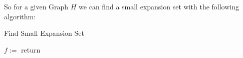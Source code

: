 So for a given Graph $H$ we can find a small expansion set with the following algorithm: 
\begin{algorithm}[h!]
	\caption{Find Small Expansion Set} 
	\begin{algorithmic}
		\State $f := $
		\State return 
		\EndFunction 
	\end{algorithmic}
\end{algorithm}	


